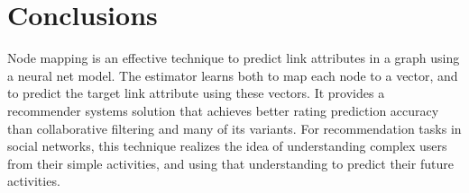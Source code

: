 \documentclass[twocolumn]{article}
\begin{document}
\section{Conclusions}
Node mapping is an effective technique to predict link attributes in a graph 
using a neural net model.
The estimator learns both to map each node to a vector, and to predict 
the target link attribute using these vectors.
It provides a recommender systems solution that achieves better rating 
prediction accuracy than collaborative filtering and many of its variants.
For recommendation tasks in social networks, this technique realizes the idea 
of understanding complex users from their simple activities, and using that 
understanding to predict their future activities.




\end{document}
